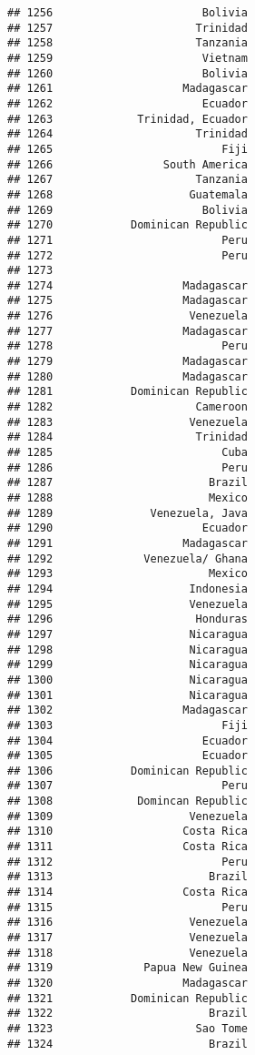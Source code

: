 \documentclass[
]{article}
\begin{document}
\begin{verbatim}
## 1256                       Bolivia
## 1257                      Trinidad
## 1258                      Tanzania
## 1259                       Vietnam
## 1260                       Bolivia
## 1261                    Madagascar
## 1262                       Ecuador
## 1263             Trinidad, Ecuador
## 1264                      Trinidad
## 1265                          Fiji
## 1266                 South America
## 1267                      Tanzania
## 1268                     Guatemala
## 1269                       Bolivia
## 1270            Dominican Republic
## 1271                          Peru
## 1272                          Peru
## 1273                              
## 1274                    Madagascar
## 1275                    Madagascar
## 1276                     Venezuela
## 1277                    Madagascar
## 1278                          Peru
## 1279                    Madagascar
## 1280                    Madagascar
## 1281            Dominican Republic
## 1282                      Cameroon
## 1283                     Venezuela
## 1284                      Trinidad
## 1285                          Cuba
## 1286                          Peru
## 1287                        Brazil
## 1288                        Mexico
## 1289               Venezuela, Java
## 1290                       Ecuador
## 1291                    Madagascar
## 1292              Venezuela/ Ghana
## 1293                        Mexico
## 1294                     Indonesia
## 1295                     Venezuela
## 1296                      Honduras
## 1297                     Nicaragua
## 1298                     Nicaragua
## 1299                     Nicaragua
## 1300                     Nicaragua
## 1301                     Nicaragua
## 1302                    Madagascar
## 1303                          Fiji
## 1304                       Ecuador
## 1305                       Ecuador
## 1306            Dominican Republic
## 1307                          Peru
## 1308             Domincan Republic
## 1309                     Venezuela
## 1310                    Costa Rica
## 1311                    Costa Rica
## 1312                          Peru
## 1313                        Brazil
## 1314                    Costa Rica
## 1315                          Peru
## 1316                     Venezuela
## 1317                     Venezuela
## 1318                     Venezuela
## 1319              Papua New Guinea
## 1320                    Madagascar
## 1321            Dominican Republic
## 1322                        Brazil
## 1323                      Sao Tome
## 1324                        Brazil

\end{verbatim}
\end{document}
